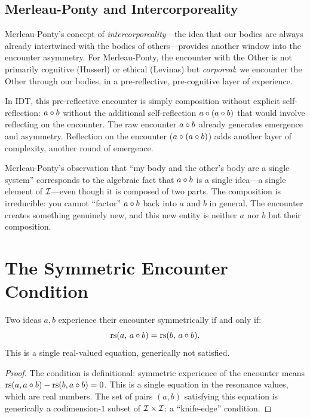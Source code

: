 \subsection{Merleau-Ponty and Intercorporeality}

Merleau-Ponty's concept of \emph{intercorporeality}---the idea that our
bodies are always already intertwined with the bodies of others---provides
another window into the encounter asymmetry.  For Merleau-Ponty, the encounter
with the Other is not primarily cognitive (Husserl) or ethical (Levinas) but
\emph{corporeal}: we encounter the Other through our bodies, in a pre-reflective,
pre-cognitive layer of experience.

In IDT, this pre-reflective encounter is simply composition without explicit
self-reflection: $a \circ b$ without the additional self-reflection
$a \circ (a \circ b)$ that would involve reflecting on the encounter.
The raw encounter $a \circ b$ already generates emergence and asymmetry.
Reflection on the encounter ($a \circ (a \circ b)$) adds another layer
of complexity, another round of emergence.

Merleau-Ponty's observation that ``my body and the other's body are a single
system'' corresponds to the algebraic fact that $a \circ b$ is a single
idea---a single element of $\mathcal{I}$---even though it is composed of two parts.
The composition is irreducible: you cannot ``factor'' $a \circ b$ back into
$a$ and $b$ in general.  The encounter creates something genuinely new, and
this new entity is neither $a$ nor $b$ but their composition.

\section{The Symmetric Encounter Condition}

\begin{theorem}
\label{thm:symmetric-encounter}
Two ideas $a, b$ experience their encounter symmetrically if and only if:
\[
\mathrm{rs}(a,\, a \circ b) = \mathrm{rs}(b,\, a \circ b).
\]
This is a single real-valued equation, generically not satisfied.
\end{theorem}

\begin{proof}
The condition is definitional: symmetric experience of the encounter means
$\mathrm{rs}(a, a \circ b) - \mathrm{rs}(b, a \circ b) = 0$.  This is a single
equation in the resonance values, which are real numbers.  The set of pairs
$(a, b)$ satisfying this equation is generically a codimension-$1$ subset of
$\mathcal{I} \times \mathcal{I}$: a ``knife-edge'' condition.
\end{proof}

